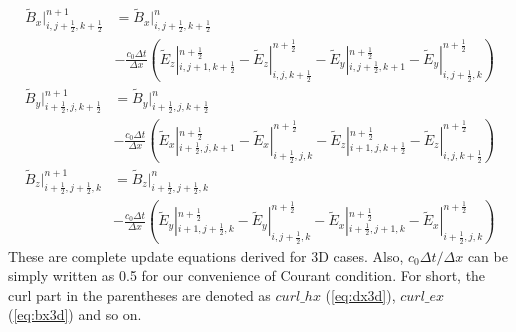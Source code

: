 \begin{equation}\label{eq:bx3d}
  \begin{split}
    \widetilde{B}_x|_{i,j+\frac{1}{2},k+\frac{1}{2}}^{n+1} & = \widetilde{B}_x|_{i,j+\frac{1}{2},k+\frac{1}{2}}^{n}\\
    & - \frac{c_0\Delta t}{\Delta x}\left(\widetilde{E}_z|_{i,j+1,k+\frac{1}{2}}^{n+\frac{1}{2}} - \widetilde{E}_z|_{i,j,k+\frac{1}{2}}^{n+\frac{1}{2}} - \widetilde{E}_y|_{i,j+\frac{1}{2},k+1}^{n+\frac{1}{2}} - \widetilde{E}_y|_{i,j+\frac{1}{2},k}^{n+\frac{1}{2}}\right)
  \end{split}
\end{equation}
\begin{equation}\label{eq:by3d}
  \begin{split}
    \widetilde{B}_y|_{i+\frac{1}{2},j,k+\frac{1}{2}}^{n+1} & = \widetilde{B}_y|_{i+\frac{1}{2},j,k+\frac{1}{2}}^{n}\\
    & - \frac{c_0\Delta t}{\Delta x}\left(\widetilde{E}_x|_{i+\frac{1}{2},j,k+1}^{n+\frac{1}{2}} - \widetilde{E}_x|_{i+\frac{1}{2},j,k}^{n+\frac{1}{2}} - \widetilde{E}_z|_{i+1,j,k+\frac{1}{2}}^{n+\frac{1}{2}} - \widetilde{E}_z|_{i,j,k+\frac{1}{2}}^{n+\frac{1}{2}}\right)
  \end{split}
\end{equation}
\begin{equation}
  \begin{split}
    \widetilde{B}_z|_{i+\frac{1}{2},j+\frac{1}{2},k}^{n+1} & = \widetilde{B}_z|_{i+\frac{1}{2},j+\frac{1}{2},k}^{n}\\
    & - \frac{c_0\Delta t}{\Delta x}\left(\widetilde{E}_y|_{i+1,j+\frac{1}{2},k}^{n+\frac{1}{2}} - \widetilde{E}_y|_{i,j+\frac{1}{2},k}^{n+\frac{1}{2}} - \widetilde{E}_x|_{i+\frac{1}{2},j+1,k}^{n+\frac{1}{2}} - \widetilde{E}_x|_{i+\frac{1}{2},j,k}^{n+\frac{1}{2}}\right)
  \end{split}
\end{equation}
These are complete update equations derived for 3D cases. Also, $c_0\Delta t/\Delta x$ can be simply written as 0.5 for
our convenience of Courant condition. For short, the curl part in the parentheses are denoted as $curl\_hx$
(\ref{eq:dx3d}), $curl\_ex$ (\ref{eq:bx3d}) and so on.

